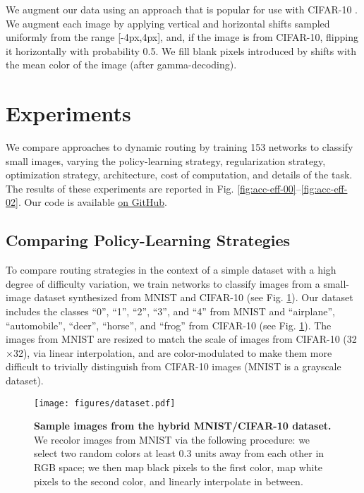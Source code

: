\documentclass{article}
\begin{document}
  We augment our data using an approach that is popular for use with CIFAR-10 \cite{lin2013network} \cite{srivastava2015training} \cite{clevert2015fast}. We augment each image by applying vertical and horizontal shifts sampled uniformly from the range [-4px,4px], and, if the image is from CIFAR-10, flipping it horizontally with probability 0.5. We fill blank pixels introduced by shifts with the mean color of the image (after gamma-decoding).
  
  \section{Experiments}
  \label{sec:experiments}

  We compare approaches to dynamic routing by training 153 networks to classify small images, varying the policy-learning strategy, regularization strategy, optimization strategy, architecture, cost of computation, and details of the task. The results of these experiments are reported in Fig. \ref*{fig:acc-eff-00}--\ref*{fig:acc-eff-02}. Our code is available \href{https://github.com/MasonMcGill/multipath-nn}{on GitHub}.

  \subsection{Comparing Policy-Learning Strategies}
  \label{subsec:policy-learning}
  
  To compare routing strategies in the context of a simple dataset with a high degree of difficulty variation, we train networks to classify images from a small-image dataset synthesized from MNIST \cite{lecun1998mnist} and CIFAR-10 \cite{krizhevsky2009learning} (see Fig. \ref*{fig:dataset}). Our dataset includes the classes ``0'', ``1'', ``2'', ``3'', and ``4'' from MNIST and ``airplane'', ``automobile'', ``deer'', ``horse'', and ``frog'' from CIFAR-10 (see Fig. \ref*{fig:dataset}). The images from MNIST are resized to match the scale of images from CIFAR-10 (32$\times$32), via linear interpolation, and are color-modulated to make them more difficult to trivially distinguish from CIFAR-10 images (MNIST is a grayscale dataset).
  
  \begin{figure}[htb]
    \centering
    \texttt{[image: figures/dataset.pdf]}
    \caption{\textbf{Sample images from the hybrid MNIST/CIFAR-10 dataset.} We recolor images from MNIST via the following procedure: we select two random colors at least 0.3 units away from each other in RGB space; we then map black pixels to the first color, map white pixels to the second color, and linearly interpolate in between.}
    \label{fig:dataset}
  \end{figure}
  
\end{document}
